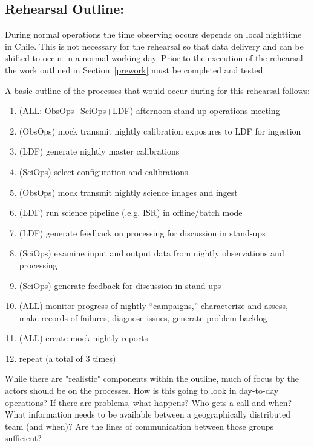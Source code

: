 \subsection{Rehearsal Outline:}
During normal operations the time observing occurs depends on local nighttime
in Chile.  This is not necessary for the rehearsal so that data delivery and
can be shifted to occur in a normal working day.  Prior to the execution of 
the rehearsal the work outlined in Section~\ref{prework} must be completed
and tested.

A basic outline of the processes that would occur during for this rehearsal 
follows:
\begin{enumerate}[topsep=-8pt]
\item (ALL: ObsOps+SciOps+LDF) afternoon stand-up operations meeting
\item (ObsOps) mock transmit nightly calibration exposures to LDF for ingestion
\item (LDF) generate nightly master calibrations
\item (SciOps) select configuration and calibrations
\item (ObsOps) mock transmit nightly science images and ingest
\item (LDF) run science pipeline (.e.g. ISR) in offline/batch mode
\item (LDF) generate feedback on processing for discussion in stand-ups
\item (SciOps) examine input and output data from nightly observations and
processing
\item (SciOps) generate feedback for discussion in stand-ups
\item (ALL) monitor progress of nightly “campaigns,” characterize and assess, 
make records of failures, diagnose issues, generate problem backlog
\item (ALL) create mock nightly reports
\item repeat (a total of 3 times)
\end{enumerate}

While there are "realistic" components within the outline, much of focus by 
the actors should be on the processes.  How is this going to look in 
day-to-day operations?  If there are problems, what happens?  Who gets a 
call and when?  What information needs to be available between a geographically
distributed team (and when)?  Are the lines of communication between those
groups sufficient?

